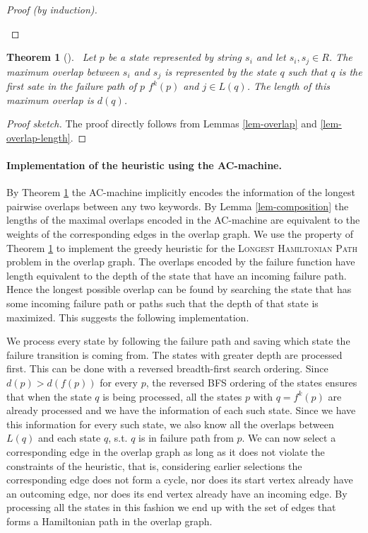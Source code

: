 \documentclass[english,twoside,censored,csm,algorithms-track-2020]{HYthesisML}
\theoremstyle{plain}
\newtheorem{theorem}{Theorem}[chapter]
\theoremstyle{definition}
\begin{document}
\begin{proof}[Proof (by induction)]
\begin{enumerate}[leftmargin=28pt]
  \end{enumerate}
\end{proof}

\begin{theorem}[]~\label{thm-maximal-overlaps}
  Let $p$ be a state represented by string $s_i$ and let $s_i,s_j\in R$. The maximum overlap between
  $s_i$ and $s_j$ is represented by the state $q$ such that $q$ is the first sate in the failure
  path of $p$ $f^k(p)$ and $j\in L(q)$. The length of this maximum overlap is $d(q)$.
\end{theorem}
\begin{proof}[Proof sketch]
  The proof directly follows from Lemmas \ref{lem-overlap} and \ref{lem-overlap-length}.
\end{proof}

\paragraph{Implementation of the heuristic using the AC-machine.}
By Theorem \ref{thm-maximal-overlaps} the AC-machine implicitly encodes the information of the
longest pairwise overlaps between any two keywords. By Lemma \ref{lem-composition} the lengths of the
maximal overlaps encoded in the AC-machine are equivalent to the weights of the corresponding edges
in the overlap graph. We use the property of Theorem \ref{thm-maximal-overlaps} to implement
the greedy heuristic for the \textsc{Longest Hamiltonian Path} problem in the overlap graph. The
overlaps encoded by the failure function have length equivalent to the depth of the state that
have an incoming failure path. Hence the longest possible overlap can be found by searching the state
that has some incoming failure path or paths such that the depth of that state is maximized. This suggests
the following implementation.

We process every state by following the failure path and saving 
which state the failure transition is coming from. 
The states with greater depth are processed first. This can be done with a reversed breadth-first
search ordering. Since $d(p) > d(f(p))$ for every $p$, the reversed BFS ordering of the states
ensures that when the state $q$ is being processed, all the states $p$ with $q=f^k(p)$ are already
processed and we have the information of each such state. Since we have this information for every such
state, we also know all the overlaps between $L(q)$ and each state $q$, s.t.
$q$ is in failure path from $p$. We can now select a corresponding edge in the overlap graph as long
as it does not violate the constraints of the heuristic, that is, considering earlier selections
the corresponding edge does not form a cycle, nor does its start vertex already have an outcoming
edge, nor does its end vertex already have an incoming edge. By processing all the states in this
fashion we end up with the set of edges that forms a Hamiltonian path in the
overlap graph. 
\end{document}
